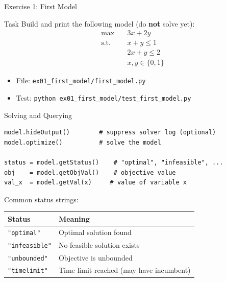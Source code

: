 \documentclass[aspectratio=169,10pt]{beamer}
\begin{document}
\begin{frame}{Exercise 1: First Model}
\begin{block}{Task}
Build and print the following model (do \textbf{not} solve yet):
\begin{align*}
  \max \quad & 3x + 2y \\
  \text{s.t.} \quad & x + y \le 1 \\
  & 2x + y \le 2 \\
  & x, y \in \{0, 1\}
\end{align*}
\end{block}
\begin{itemize}
  \item File: \texttt{ex01\_first\_model/first\_model.py}
  \item Test: \texttt{python ex01\_first\_model/test\_first\_model.py}
\end{itemize}
\end{frame}

\begin{frame}[fragile]{Solving and Querying}
\begin{lstlisting}
model.hideOutput()        # suppress solver log (optional)
model.optimize()          # solve the model

status = model.getStatus()    # "optimal", "infeasible", ...
obj    = model.getObjVal()    # objective value
val_x  = model.getVal(x)     # value of variable x
\end{lstlisting}

\medskip
Common status strings:
\begin{table}
\centering\small
\begin{tabular}{ll}
\toprule
\textbf{Status} & \textbf{Meaning} \\
\midrule
\texttt{"optimal"}    & Optimal solution found \\
\texttt{"infeasible"} & No feasible solution exists \\
\texttt{"unbounded"}  & Objective is unbounded \\
\texttt{"timelimit"}  & Time limit reached (may have incumbent) \\
\bottomrule
\end{tabular}
\end{table}
\end{frame}
\end{document}
